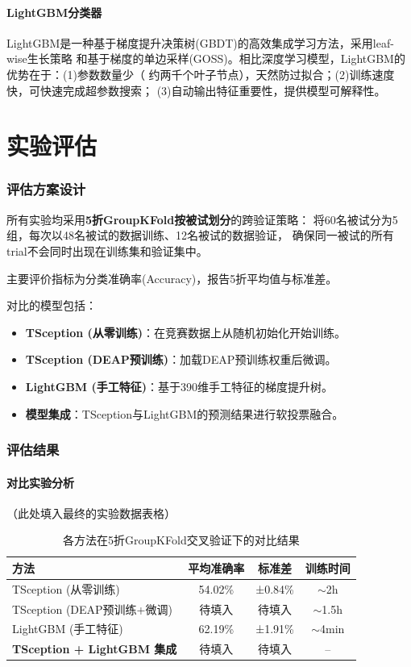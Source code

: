 \documentclass[12pt,a4paper]{ctexrep}
\begin{document}
\subsubsection{LightGBM分类器}

LightGBM是一种基于梯度提升决策树(GBDT)的高效集成学习方法，采用leaf-wise生长策略
和基于梯度的单边采样(GOSS)。相比深度学习模型，LightGBM的优势在于：(1)参数数量少（
约两千个叶子节点），天然防过拟合；(2)训练速度快，可快速完成超参数搜索；
(3)自动输出特征重要性，提供模型可解释性。

\chapter{实验评估}

\subsection{评估方案设计}

所有实验均采用\textbf{5折GroupKFold按被试划分}的跨验证策略：
将60名被试分为5组，每次以48名被试的数据训练、12名被试的数据验证，
确保同一被试的所有trial不会同时出现在训练集和验证集中。

主要评价指标为分类准确率(Accuracy)，报告5折平均值与标准差。

对比的模型包括：
\begin{itemize}
    \item \textbf{TSception (从零训练)}：在竞赛数据上从随机初始化开始训练。
    \item \textbf{TSception (DEAP预训练)}：加载DEAP预训练权重后微调。
    \item \textbf{LightGBM (手工特征)}：基于390维手工特征的梯度提升树。
    \item \textbf{模型集成}：TSception与LightGBM的预测结果进行软投票融合。
\end{itemize}

\subsection{评估结果}

\subsubsection{对比实验分析}

（此处填入最终的实验数据表格）

\begin{table}[htbp]
\centering
\caption{各方法在5折GroupKFold交叉验证下的对比结果}
\label{tab:results}
\begin{tabular}{lccc}
\toprule
\textbf{方法} & \textbf{平均准确率} & \textbf{标准差} & \textbf{训练时间} \\
\midrule
TSception (从零训练) & 54.02\% & ±0.84\% & $\sim$2h \\
TSception (DEAP预训练+微调) & 待填入 & 待填入 & $\sim$1.5h \\
LightGBM (手工特征) & 62.19\% & ±1.91\% & $\sim$4min \\
\textbf{TSception + LightGBM 集成} & 待填入 & 待填入 & -- \\
\bottomrule
\end{tabular}
\end{table}
\end{document}
